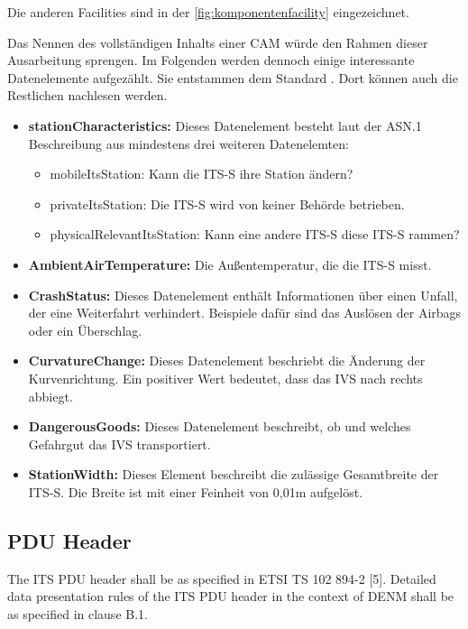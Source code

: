 Die anderen Facilities sind in der \autoref{fig:komponentenfacility} eingezeichnet. 

Das Nennen des vollständigen Inhalts einer \ac{CAM} würde den Rahmen dieser Ausarbeitung sprengen. Im Folgenden werden dennoch einige interessante Datenelemente aufgezählt. Sie entstammen dem Standard \cite{ts102637-2}. Dort können auch die Restlichen nachlesen werden.

\begin{itemize}
	\item \textbf{stationCharacteristics: } Dieses Datenelement besteht laut der \ac{ASN.1} Beschreibung aus mindestens drei weiteren Datenelemten:
	\begin{itemize}
		\item mobileItsStation: Kann die \ac{ITS-S} ihre Station ändern?
		\item privateItsStation: Die \ac{ITS-S} wird von keiner Behörde betrieben.
		\item physicalRelevantItsStation: Kann eine andere \ac{ITS-S} diese \ac{ITS-S} rammen?
	\end{itemize}
	\item \textbf{AmbientAirTemperature: } Die Außentemperatur, die die \ac{ITS-S} misst.
	\item \textbf{CrashStatus: } Dieses Datenelement enthält Informationen über einen Unfall, der eine Weiterfahrt verhindert. Beispiele dafür sind das Auslösen der Airbags oder ein Überschlag.
	\item \textbf{CurvatureChange: } Dieses Datenelement beschriebt die Änderung der Kurvenrichtung. Ein positiver Wert bedeutet, dass das \ac{IVS} nach rechts abbiegt.
	\item  \textbf{DangerousGoods: } Dieses Datenelement beschreibt, ob und welches Gefahrgut  das \ac{IVS} transportiert.
	\item \textbf{StationWidth: } Dieses Element beschreibt die zulässige Gesamtbreite der \ac{ITS-S}. Die Breite ist mit einer Feinheit von 0,01m aufgelöst.
\end{itemize}

\subsection{PDU Header \label{facilitylayer_PduHeader}}
The ITS PDU header shall be as specified in ETSI TS 102 894-2 [5]. Detailed data presentation rules of the ITS PDU header in the context of DENM shall be as specified in clause B.1.

